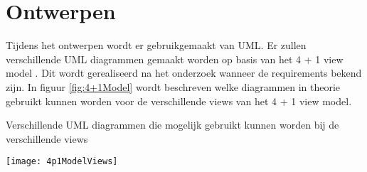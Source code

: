 \section{Ontwerpen}
\label{sec:Ontwerpen}
Tijdens het ontwerpen wordt er gebruikgemaakt van UML.
Er zullen verschillende UML diagrammen gemaakt worden op basis van het 4 + 1 view model \Parencite{4+1Model} .
Dit wordt gerealiseerd na het onderzoek wanneer de requirements bekend zijn.
In figuur \ref{fig:4+1Model} wordt beschreven welke diagrammen in theorie gebruikt kunnen worden voor de verschillende views van het 4 + 1 view model.\\
\begin{graphic}
    \vspace{0.2cm}
    \captionsetup{type=figure}
    \caption{Verschillende UML diagrammen die mogelijk gebruikt kunnen worden bij de verschillende views \Parencite{4p1ModelViews}}
    \texttt{[image: 4p1ModelViews]}
    \label{fig:4+1Model}
    \vspace{0.2cm}
\end{graphic}
